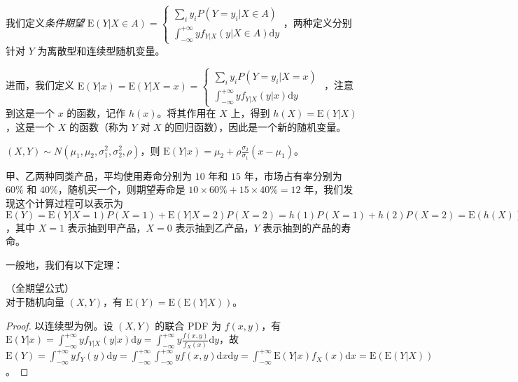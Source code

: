 \documentclass[../main.tex]{subfiles}
\begin{document}
我们定义\emph{条件期望} $\mathrm E(Y|X\in A)=\left\{
    \begin{aligned}
        \sum_iy_iP(Y=y_i|X\in A) \\
        \int_{-\infty}^{+\infty}yf_{Y|X}(y|X\in A)\mathrm dy
    \end{aligned}\right.$，两种定义分别针对 $Y$ 为离散型和连续型随机变量。

进而，我们定义 $\mathrm E(Y|x)=\mathrm E(Y|X=x)=\left\{
    \begin{aligned}
        \sum_iy_iP(Y=y_i|X=x) \\
        \int_{-\infty}^{+\infty}yf_{Y|X}(y|x)\mathrm dy
    \end{aligned}\right.$
，注意到这是一个 $x$ 的函数，记作 $h(x)$。将其作用在 $X$ 上，得到 $h(X)=\mathrm E(Y|X)$，这是一个 $X$ 的函数（称为 $Y$ 对 $X$ 的回归函数），因此是一个新的随机变量。

\begin{example}
    $(X,Y)\sim N(\mu_1,\mu_2,\sigma_1^2,\sigma_2^2,\rho)$，则 $\mathrm E(Y|x)=\mu_2+\rho\frac{\sigma_2}{\sigma_1}(x-\mu_1)$。
\end{example}

\begin{example}
    甲、乙两种同类产品，平均使用寿命分别为 $10$ 年和 $15$ 年，市场占有率分别为 $60\%$ 和 $40\%$，随机买一个，则期望寿命是 $10\times 60\%+15\times 40\%=12$ 年，我们发现这个计算过程可以表示为 $\mathrm E(Y)=\mathrm E(Y|X=1)P(X=1)+\mathrm E(Y|X=2)P(X=2)=h(1)P(X=1)+h(2)P(X=2)=\mathrm E(h(X))=\mathrm E(\mathrm E(Y|X))$，其中 $X=1$ 表示抽到甲产品，$X=0$ 表示抽到乙产品，$Y$ 表示抽到的产品的寿命。
\end{example}

一般地，我们有以下定理：

\begin{theorem}\label{thm:4.7.1}
    （全期望公式）\\
    对于随机向量 $(X,Y)$，有 $\mathrm E(Y)=\mathrm E(\mathrm E(Y|X))$。
\end{theorem}

\begin{proof}
    以连续型为例。设 $(X,Y)$ 的联合 PDF 为 $f(x,y)$，有 $\mathrm E(Y|x)=\int_{-\infty}^{+\infty}yf_{Y|X}(y|x)\mathrm dy=\int_{-\infty}^{+\infty}y\frac{f(x,y)}{f_X(x)}\mathrm dy$，故 $\mathrm E(Y)=\int_{-\infty}^{+\infty}yf_Y(y)\mathrm dy=\int_{-\infty}^{+\infty}\int_{-\infty}^{+\infty}yf(x,y)\mathrm dx\mathrm dy=\int_{-\infty}^{+\infty}\mathrm E(Y|x)f_X(x)\mathrm dx=\mathrm E(\mathrm E(Y|X))$。
\end{proof}
\end{document}
